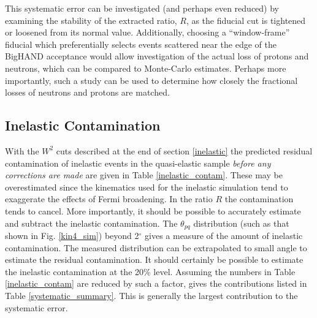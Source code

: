 \documentclass[12pt,letterpaper,oneside]{article}
\begin{document}
This systematic error can be investigated (and perhaps even reduced)
by examining the stability of the extracted ratio, $R$, as the
fiducial cut is tightened or loosened from its normal value.
Additionally, choosing a ``window-frame'' fiducial which
preferentially selects events scattered near the edge of the BigHAND
acceptance would allow investigation of the actual loss of protons and
neutrons, which can be compared to Monte-Carlo estimates.  Perhaps
more importantly, such a study can be used to determine how closely
the fractional losses of neutrons and protons are matched.

\subsection{Inelastic Contamination}

With the $W^2$ cuts described at the end of  section \ref{inelastic}
the predicted
residual contamination of inelastic events in the quasi-elastic sample
{\em before any corrections are made}
are given in Table \ref{inelastic_contam}.
These may be overestimated since the kinematics used for the inelastic
simulation tend to exaggerate the effects of Fermi broadening.
In the ratio $R$ the contamination tends to cancel.  More importantly,
it should be possible to accurately estimate and subtract the
inelastic contamination.  The $\theta_{pq}$ distribution
(such as that shown in Fig. \ref{kin4_sim}) beyond
2$^\circ$ gives a measure of the amount of inelastic
contamination.  The measured distribution can be
extrapolated to small angle to estimate the residual
contamination.   It should certainly be possible
to estimate the inelastic contamination at the 20\% level.  Assuming
the numbers in Table \ref{inelastic_contam} are reduced by such a
factor, gives the contributions listed in 
Table \ref{systematic_summary}.   This is generally the largest contribution to
the systematic error.
\end{document}
